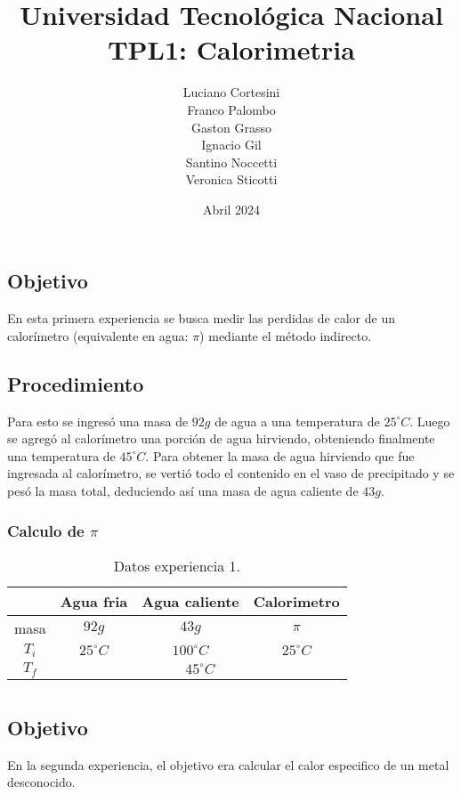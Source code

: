 \documentclass[12pt]{report}
\title{Universidad Tecnológica Nacional\\TPL1: Calorimetria}
\author{
Luciano Cortesini\\
Franco Palombo\\
Gaston Grasso\\
Ignacio Gil\\
Santino Noccetti\\
Veronica Sticotti
}
\date{Abril 2024}
\begin{document}
\maketitle

\chapter{}
\section{Objetivo}
En esta primera experiencia se busca medir las perdidas de calor de un calorímetro (equivalente en agua: $\pi$) mediante el método indirecto. 

\section{Procedimiento}
Para esto se ingresó una masa de $92 g$ de agua a una temperatura de $25^\circ C$.
Luego se agregó al calorímetro una porción de agua hirviendo, obteniendo finalmente una temperatura de  $45^\circ C$. 
Para obtener la masa de agua hirviendo que fue ingresada al calorímetro, se vertió todo el contenido en el vaso de precipitado y se pesó la masa total, deduciendo así una masa de agua caliente de $43g$.
\subsection{Calculo de $\pi$}
\begin{table}[htbp]
    \centering
    \begin{tabular}{|c|c|c|c|}
    \hline
    & Agua fria & Agua caliente & Calorimetro\\
    \hline
    masa & $92g$ & $43g$ & $\pi$ \\
    \hline
   $T_i$ & $25^\circ C$ & $100^\circ C$ & $25^\circ C$\\
    \hline
     $T_f$ & \multicolumn{3}{|c|}{$45^\circ C$}\\
    \hline
    \end{tabular}
    \caption{Datos experiencia 1.}
    \label{tab:datos experiencia 1}
\end{table}

\chapter{}
\section{Objetivo}
En la segunda experiencia, el objetivo era calcular el calor especifico de un metal desconocido.
\end{document}
